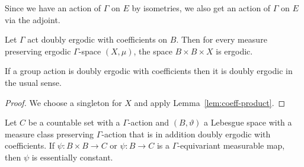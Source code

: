 \begin{rem}
  Since we have an action of \(\Gamma\) on \(E\) by isometries, we also get an action of \(\Gamma\) on \(E\) via the adjoint.
\end{rem}

\begin{lemma}
  \label{lem:coeff-product}
  Let \(\Gamma\) act doubly ergodic with coefficients on \(B\). Then for every measure preserving ergodic \(\Gamma\)-space \((X, \mu)\), the space \(B \times B \times X\) is ergodic.
\end{lemma}

\begin{cor}
  \label{cor:coeff-ergodic}
  If a group action is doubly ergodic with coefficients then it is doubly ergodic in the usual sense.
\end{cor}

\begin{proof}
  We choose a singleton for \(X\) and apply Lemma~\ref{lem:coeff-product}.
\end{proof}

\begin{lemma}[{\cite[Lemma~4.4]{MR3509968}}]
  \label{lem:4.4}
  Let \(C\) be a countable set with a \(\Gamma\)-action and \((B, \vartheta)\) a Lebesgue space with a measure class preserving \(\Gamma\)-action that is in addition doubly ergodic with coefficients. If \(\psi \colon B \times B \to C\) or \(\psi \colon B \to C\) is a \(\Gamma\)-equivariant measurable map, then \(\psi\) is essentially constant.
\end{lemma}

